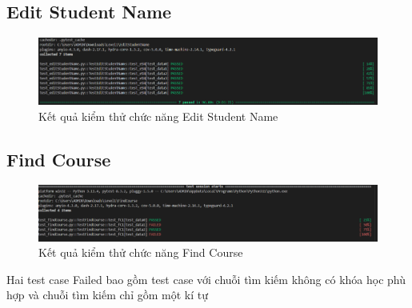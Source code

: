 \subsection{Edit Student Name}
\begin{figure}[H]
\centering
\includegraphics[width=\linewidth]{image/edit-student-name.png}
\caption{Kết quả kiểm thử chức năng Edit Student Name}
\end{figure}
\subsection{Find Course}
\begin{figure}[H]
\centering
\includegraphics[width=\linewidth]{image/result_find_course.png}
\caption{Kết quả kiểm thử chức năng Find Course}
\end{figure}

Hai test case Failed bao gồm test case với chuỗi tìm kiếm không có khóa học phù hợp và chuỗi tìm kiếm chỉ gồm một kí tự